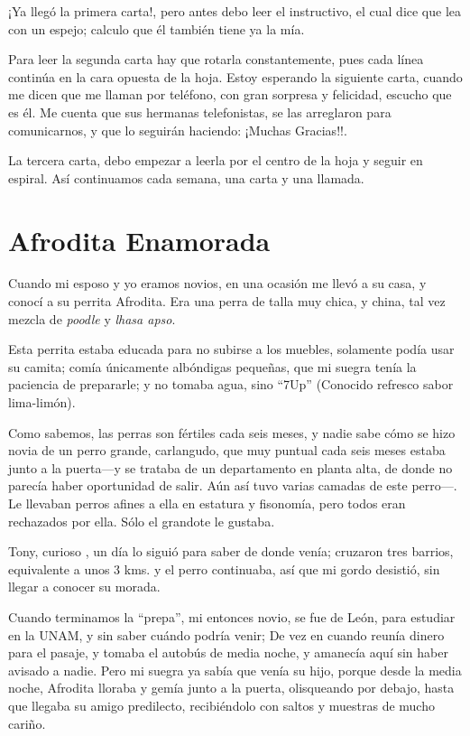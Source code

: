 \documentclass[letterpaper, 12pt]{book}
\begin{document}
¡Ya llegó la primera carta!, pero antes debo leer el instructivo, el cual dice que lea con un espejo; calculo que él también tiene ya la mía. 

Para leer la segunda carta hay que rotarla constantemente, pues cada línea continúa en la cara opuesta de la hoja. Estoy esperando la siguiente carta, cuando me dicen que me llaman por teléfono, con gran sorpresa y felicidad, escucho que es él. Me cuenta que sus hermanas telefonistas, se las arreglaron para comunicarnos, y que lo seguirán haciendo: ¡Muchas Gracias!!.

La tercera carta, debo empezar a leerla por el centro de la hoja y seguir en espiral. Así continuamos cada semana, una carta y una llamada. 

\chapter{Afrodita Enamorada}
Cuando mi esposo y yo eramos novios, en una ocasión me llevó a su casa, y conocí a su perrita Afrodita. Era una perra de talla muy chica, y china, tal vez mezcla de {\it poodle} y {\it lhasa apso}. 

Esta perrita estaba educada para no subirse a los muebles, solamente podía usar su camita; comía únicamente albóndigas pequeñas, que mi suegra tenía la paciencia de prepararle; y no tomaba agua, sino ``7Up'' (Conocido refresco sabor lima-limón).

Como sabemos, las perras son fértiles cada seis meses, y nadie sabe cómo se hizo novia de un perro grande, carlangudo, que muy puntual cada seis meses estaba junto a la puerta---y se trataba de un departamento en planta alta, de donde no parecía haber oportunidad de salir. Aún así tuvo varias camadas de este perro---. Le llevaban perros afines a ella en estatura y fisonomía, pero todos eran rechazados por ella. Sólo el grandote le gustaba.

Tony, curioso , un día lo siguió para saber de donde venía; cruzaron tres barrios, equivalente a unos 3 kms. y el perro continuaba, así que mi gordo desistió, sin llegar a conocer su morada.

Cuando terminamos la ``prepa'', mi entonces novio, se fue de León, para estudiar en la UNAM, y sin saber cuándo podría venir; De vez en cuando reunía dinero para el pasaje, y tomaba el autobús de media noche, y amanecía aquí sin haber avisado a nadie. Pero mi suegra ya sabía que venía su hijo, porque desde la media noche, Afrodita lloraba y gemía junto a la puerta, olisqueando por debajo, hasta que llegaba su amigo predilecto, recibiéndolo con saltos y muestras de mucho cariño.
\end{document}
